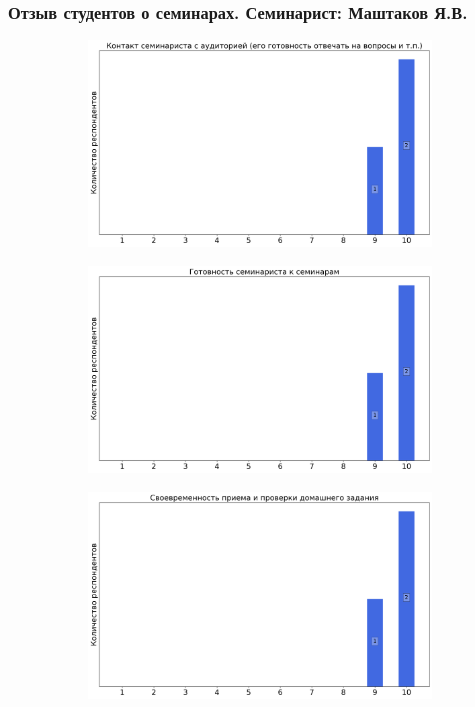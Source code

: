     \subsubsection{Отзыв студентов о семинарах. Семинарист: Маштаков Я.В.}
		\begin{figure}[H]
			\centering
			\begin{subfigure}[b]{0.45\textwidth}
				\centering
				\includegraphics[width=\textwidth]{images/2 course/Аналитическая механика/seminarists-marks-Маштаков Я.В.-0.png}
			\end{subfigure}
			\begin{subfigure}[b]{0.45\textwidth}
				\centering
				\includegraphics[width=\textwidth]{images/2 course/Аналитическая механика/seminarists-marks-Маштаков Я.В.-1.png}
			\end{subfigure}
			\begin{subfigure}[b]{0.45\textwidth}
				\centering
				\includegraphics[width=\textwidth]{images/2 course/Аналитическая механика/seminarists-marks-Маштаков Я.В.-2.png}

\end{subfigure}
\end{figure}
